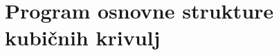 \documentclass[12pt,a4paper,twoside]{article}
\newcommand{\literatura}{literatura}  %
\theoremstyle{definition} %
\theoremstyle{plain} %
\numberwithin{equation}{section}  %
\begin{document}
\appendix

\section{Program osnovne strukture kubičnih krivulj}









\cleardoublepage                           %

\cleardoublepage                           %
\printindex
\end{document}
